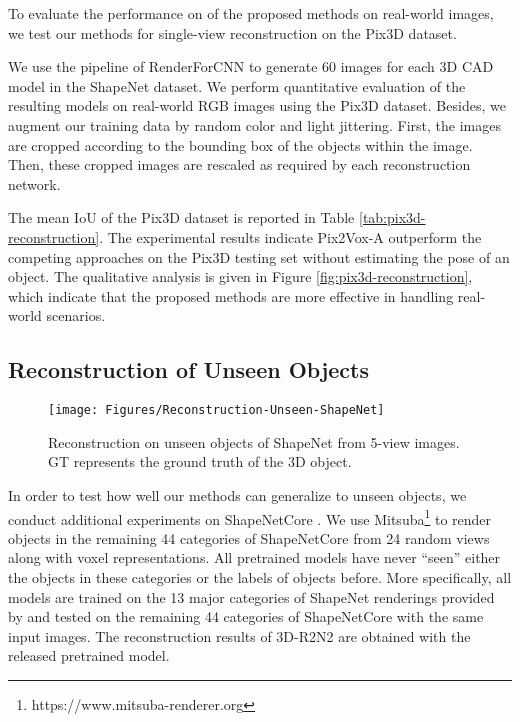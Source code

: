 \documentclass[10pt,twocolumn,letterpaper]{article}
\begin{document}
To evaluate the performance on of the proposed methods on real-world images, we test our methods for single-view reconstruction on the Pix3D dataset.

We use the pipeline of RenderForCNN \cite{DBLP:conf/iccv/SuQLG15} to generate 60 images for each 3D CAD model in the ShapeNet dataset.
We perform quantitative evaluation of the resulting models on real-world RGB images using the Pix3D dataset.
Besides, we augment our training data by random color and light jittering.
First, the images are cropped according to the bounding box of the objects within the image.
Then, these cropped images are rescaled as required by each reconstruction network.

The mean IoU of the Pix3D dataset is reported in Table \ref{tab:pix3d-reconstruction}.
The experimental results indicate Pix2Vox-A outperform the competing approaches on the Pix3D testing set without estimating the pose of an object.
The qualitative analysis is given in Figure \ref{fig:pix3d-reconstruction}, which indicate that the proposed methods are more effective in handling real-world scenarios.

\subsection{Reconstruction of Unseen Objects}

\begin{figure}
  \centering
  \resizebox{\linewidth}{!} {
    \texttt{[image: Figures/Reconstruction-Unseen-ShapeNet]}
  }
  \caption{Reconstruction on unseen objects of ShapeNet from 5-view images. GT represents the ground truth of the 3D object.}
  \label{fig:shapenet-unseen-reconstruction}
  \vspace{-2 mm}
\end{figure}

In order to test how well our methods can generalize to unseen objects, we conduct additional experiments on ShapeNetCore \cite{DBLP:conf/cvpr/WuSKYZTX15}.
We use Mitsuba\footnote{https://www.mitsuba-renderer.org} to render objects in the remaining 44 categories of ShapeNetCore from 24 random views along with voxel representations.
All pretrained models have never ``seen'' either the objects in these categories or the labels of objects before.
More specifically, all models are trained on the 13 major categories of ShapeNet renderings provided by \cite{DBLP:conf/eccv/ChoyXGCS16} and tested on the remaining 44 categories of ShapeNetCore with the same input images.
The reconstruction results of 3D-R2N2 are obtained with the released pretrained model.
\end{document}
